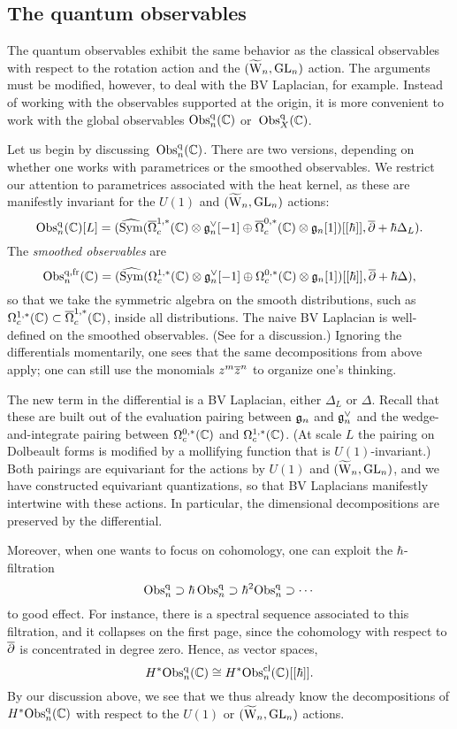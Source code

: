 \subsection{The quantum observables}

The quantum observables exhibit the same behavior as the classical observables
with respect to the rotation action and the $(\widetilde{{{\rm W}}}_n,{\rm GL}_n)$ action.
The arguments must be modified, however, to deal with the BV Laplacian, for example.
Instead of working with the observables supported at the origin, 
it is more convenient to work with the global observables ${\rm Obs}^{\rm q}_n(\mathbb C)$ or~${\rm Obs}^{\rm q}_X(\mathbb C)$.

Let us begin by discussing~${\rm Obs}^{\rm q}_n(\mathbb C)$.
There are two versions, depending on whether one works with parametrices or the smoothed observables.
We restrict our attention to parametrices associated with the heat kernel, 
as these are manifestly invariant for the $U(1)$ and $(\widetilde{{{\rm W}}}_n,{\rm GL}_n)$ actions:
\[
{\rm Obs}^{\rm q}_n(\mathbb C)[L] = (\widehat{{\rm Sym}}(\overline{\Omega}^{1,*}_c(\mathbb C) \otimes \mathfrak{g}_n^\vee[-1] \oplus \overline{\Omega}^{0,*}_c(\mathbb C) \otimes \mathfrak{g}_n[1])[[\hbar]], \overline{\partial} + \hbar \Delta_L).
\]
The {\em smoothed observables} are
\[
{{\rm Obs}}^{{\rm q},{\rm fr}}_n(\mathbb C) = (\widehat{{\rm Sym}}(\Omega^{1,*}_c(\mathbb C) \otimes \mathfrak{g}_n^\vee[-1] \oplus \Omega^{0,*}_c(\mathbb C) \otimes \mathfrak{g}_n[1])[[\hbar]], \overline{\partial} + \hbar \Delta),
\]
so that we take the symmetric algebra on the smooth distributions,
such as $\Omega^{1,*}_c(\mathbb C) \subset \overline{\Omega}^{1,*}_c(\mathbb C)$, inside all distributions. 
The naive BV Laplacian is well-defined on the smoothed observables. 
(See \cite{CG1} for a discussion.)
Ignoring the differentials momentarily, one sees that the same decompositions from above apply;
one can still use the monomials $z^m \overline{z}^n$ to organize one's
thinking.

The new term in the differential is a BV Laplacian, either $\Delta_L$ or $\Delta$.
Recall that these are built out of the evaluation pairing between $\mathfrak{g}_n$ and $\mathfrak{g}_n^\vee$
and the wedge-and-integrate pairing between $\Omega^{0,*}_c(\mathbb C)$ and $\Omega^{1,*}_c(\mathbb C)$.
(At scale $L$ the pairing on Dolbeault forms is modified by a mollifying function that is $U(1)$-invariant.)
Both pairings are equivariant for the actions by $U(1)$ and $(\widetilde{{{\rm W}}}_n,{\rm GL}_n)$,
and we have constructed equivariant quantizations, 
so that BV Laplacians manifestly intertwine with these actions.
In particular, the dimensional decompositions are preserved by the differential.
 
Moreover, when one wants to focus on cohomology, one can exploit the $\hbar$-filtration 
\[
{\rm Obs}^{\rm q}_n \supset \hbar\, {\rm Obs}^{\rm q}_n \supset \hbar^2 {\rm Obs}^{\rm q}_n \supset \cdots
\]
to good effect. 
For instance, there is a spectral sequence associated to this filtration, 
and it collapses on the first page, since the cohomology with respect to $\overline{\partial}$ is concentrated in degree zero.
Hence, as vector spaces,
\[
H^* {\rm Obs}^{\rm q}_n(\mathbb C) \cong H^* {\rm Obs}^{\rm cl}_n(\mathbb C)[[\hbar]].
\]
By our discussion above, we see that we thus already know the decompositions
of $H^* {\rm Obs}^{\rm q}_n(\mathbb C)$ with respect to the $U(1)$ or $(\widetilde{{{\rm W}}}_n,{\rm GL}_n)$ actions.

